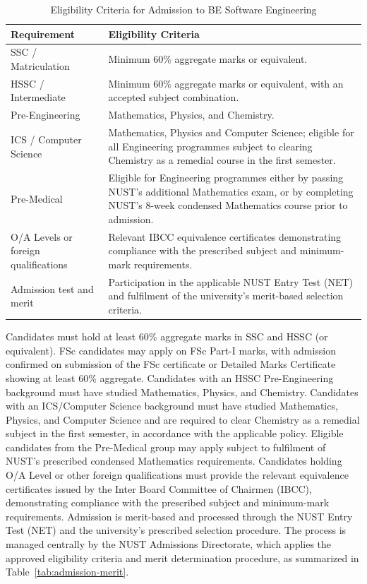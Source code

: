 \begin{table}[htbp]
\centering
\caption{Eligibility Criteria for Admission to BE Software Engineering}
\label{tab:admission-eligibility}
\small
\renewcommand{\arraystretch}{1.2}
\begin{tabular}{|p{}|p{}|}
\hline
\textbf{Requirement} & \textbf{Eligibility Criteria} \\ \hline
SSC / Matriculation & Minimum 60\% aggregate marks or equivalent. \\ \hline
HSSC / Intermediate & Minimum 60\% aggregate marks or equivalent, with an accepted subject combination. \\ \hline
Pre-Engineering & Mathematics, Physics, and Chemistry. \\ \hline
ICS / Computer Science & Mathematics, Physics and Computer Science; eligible for all Engineering programmes subject to clearing Chemistry as a remedial course in the first semester. \\ \hline
Pre-Medical & Eligible for Engineering programmes either by passing NUST’s additional Mathematics exam, or by completing NUST’s 8-week condensed Mathematics course prior to admission. \\ \hline
O/A Levels or foreign qualifications & Relevant IBCC equivalence certificates demonstrating compliance with the prescribed subject and minimum-mark requirements. \\ \hline
Admission test and merit & Participation in the applicable NUST Entry Test (NET) and fulfilment of the university's merit-based selection criteria. \\ \hline
\end{tabular}
\end{table}

Candidates must hold at least 60\% aggregate marks in SSC and HSSC (or equivalent). FSc candidates may apply on FSc Part-I marks, with admission confirmed on submission of the FSc certificate or Detailed Marks Certificate showing at least 60\% aggregate. Candidates with an HSSC Pre-Engineering background must have studied Mathematics, Physics, and Chemistry. Candidates with an ICS/Computer Science background must have studied Mathematics, Physics, and Computer Science and are required to clear Chemistry as a remedial subject in the first semester, in accordance with the applicable policy. Eligible candidates from the Pre-Medical group may apply subject to fulfilment of NUST's prescribed condensed Mathematics requirements. Candidates holding O/A Level or other foreign qualifications must provide the relevant equivalence certificates issued by the Inter Board Committee of Chairmen (IBCC), demonstrating compliance with the prescribed subject and minimum-mark requirements. Admission is merit-based and processed through the NUST Entry Test (NET) and the university's prescribed selection procedure. The process is managed centrally by the NUST Admissions Directorate, which applies the approved eligibility criteria and merit determination procedure, as summarized in Table~\ref{tab:admission-merit}.

